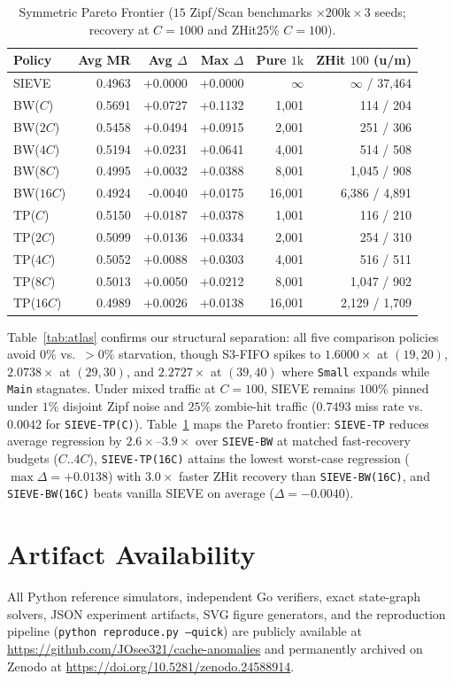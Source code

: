 \documentclass[10pt,twocolumn]{article}
\begin{document}
\begin{table}[t]
\centering
\caption{Symmetric Pareto Frontier ($15$ Zipf/Scan benchmarks $\times 200\text{k} \times 3$ seeds; recovery at $C=1000$ and ZHit25\% $C=100$).}
\label{tab:pareto}
\small
\begin{tabular}{lrrrrr}
\toprule
Policy & Avg MR & Avg $\Delta$ & Max $\Delta$ & Pure $1\text{k}$ & ZHit $100$ (u/m) \\
\midrule
SIEVE & 0.4963 & +0.0000 & +0.0000 & $\infty$ & $\infty$ / 37,464 \\
BW($C$) & 0.5691 & +0.0727 & +0.1132 & 1,001 & 114 / 204 \\
BW($2C$) & 0.5458 & +0.0494 & +0.0915 & 2,001 & 251 / 306 \\
BW($4C$) & 0.5194 & +0.0231 & +0.0641 & 4,001 & 514 / 508 \\
BW($8C$) & 0.4995 & +0.0032 & +0.0388 & 8,001 & 1,045 / 908 \\
BW($16C$) & 0.4924 & -0.0040 & +0.0175 & 16,001 & 6,386 / 4,891 \\
TP($C$) & 0.5150 & +0.0187 & +0.0378 & 1,001 & 116 / 210 \\
TP($2C$) & 0.5099 & +0.0136 & +0.0334 & 2,001 & 254 / 310 \\
TP($4C$) & 0.5052 & +0.0088 & +0.0303 & 4,001 & 516 / 511 \\
TP($8C$) & 0.5013 & +0.0050 & +0.0212 & 8,001 & 1,047 / 902 \\
TP($16C$) & 0.4989 & +0.0026 & +0.0138 & 16,001 & 2,129 / 1,709 \\
\bottomrule
\end{tabular}
\end{table}

Table~\ref{tab:atlas} confirms our structural separation: all five comparison policies avoid $0\%$ vs.\ $>0\%$ starvation, though S3-FIFO spikes to $1.6000\times$ at $(19,20)$, $2.0738\times$ at $(29,30)$, and $2.2727\times$ at $(39,40)$ where \texttt{Small} expands while \texttt{Main} stagnates. Under mixed traffic at $C=100$, SIEVE remains $100\%$ pinned under $1\%$ disjoint Zipf noise and $25\%$ zombie-hit traffic ($0.7493$ miss rate vs.\ $0.0042$ for \texttt{SIEVE-TP(C)}). Table~\ref{tab:pareto} maps the Pareto frontier: \texttt{SIEVE-TP} reduces average regression by $2.6\times$--$3.9\times$ over \texttt{SIEVE-BW} at matched fast-recovery budgets ($C..4C$), \texttt{SIEVE-TP(16C)} attains the lowest worst-case regression ($\max\Delta = +0.0138$) with $3.0\times$ faster ZHit recovery than \texttt{SIEVE-BW(16C)}, and \texttt{SIEVE-BW(16C)} beats vanilla SIEVE on average ($\Delta = -0.0040$).

\section*{Artifact Availability}
All Python reference simulators, independent Go verifiers, exact state-graph solvers, JSON experiment artifacts, SVG figure generators, and the reproduction pipeline (\texttt{python reproduce.py --quick}) are publicly available at \url{https://github.com/JOsee321/cache-anomalies} and permanently archived on Zenodo at \url{https://doi.org/10.5281/zenodo.24588914}.
\end{document}
